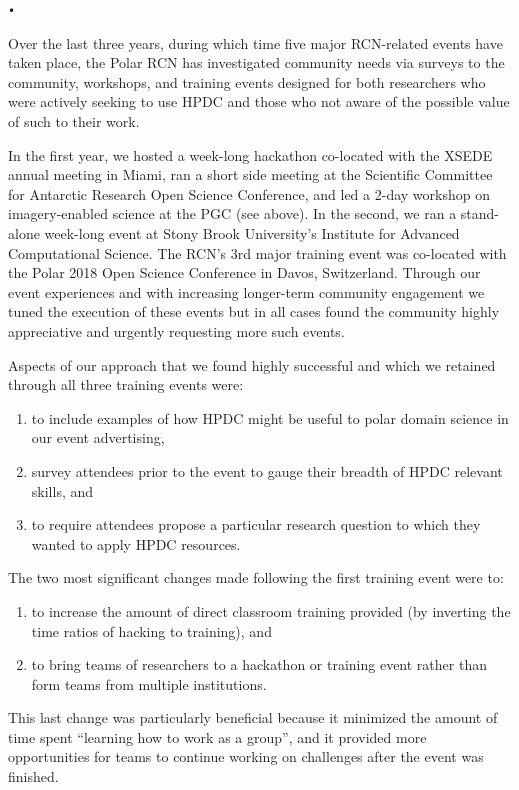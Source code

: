 \texttt{•}\documentclass[10pt,letterpaper,draft]{article}
\begin{document}
Over the last three years, during which time five major RCN-related events have taken place, the Polar RCN has investigated community needs via surveys to the community, workshops, and training events designed for both researchers who were actively seeking to use HPDC and those who not aware of the possible value of such to their work.

In the first year, we hosted a week-long hackathon co-located with the XSEDE annual meeting in Miami, ran a short side meeting at the Scientific Committee for Antarctic Research Open Science Conference, and led a 2-day workshop on imagery-enabled science at the PGC (see above). In the second, we ran a stand-alone week-long event at Stony Brook University's Institute for Advanced Computational Science. The RCN's 3rd major training event was co-located with the Polar 2018 Open Science Conference in Davos, Switzerland. Through our event experiences and with increasing longer-term community engagement we tuned the execution of these events but in all cases found the community highly appreciative and urgently requesting more such events.

Aspects of our approach that we found highly successful and which we retained through all three training events were:

\begin{enumerate}
    \item to include examples of how HPDC might be useful to polar domain science in our event advertising,
\item survey attendees prior to the event to gauge their breadth of HPDC relevant skills, and
\item to require attendees propose a particular research question to which they wanted to apply HPDC resources.
\end{enumerate}

The two most significant changes made following the first training event were to:
\begin{enumerate}
    \item to increase the amount of direct classroom training provided (by inverting the time ratios of hacking to training), and
\item to bring teams of researchers to a hackathon or training event rather than form teams from multiple institutions.
\end{enumerate}

This last change was particularly beneficial because it minimized the amount of time spent ``learning how to work as a group'', and it provided more opportunities for teams to continue working on challenges after the event was finished.
\end{document}
